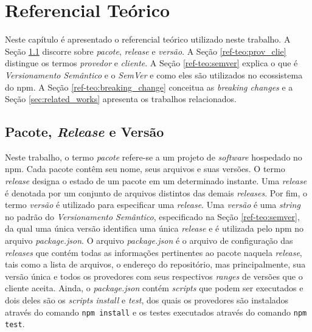 \chapter{Referencial Teórico}
\label{cap:ref-teorico}
Neste capítulo é apresentado o referencial teórico utilizado neste trabalho. A Seção \ref{ref-teo:pac_rel_ver} discorre sobre \textit{pacote}, \textit{release} e \textit{versão}. A Seção \ref{ref-teo:prov_clie} distingue os termos \textit{provedor} e \textit{cliente}. A Seção \ref{ref-teo:semver} explica o que é \textit{Versionamento Semântico} e o \textit{SemVer} e como eles são utilizados no ecossistema do \textsf{npm}. A Seção \ref{ref-teo:breaking_change} conceitua as \textit{breaking changes} e a Seção \ref{sec:related_works} apresenta os trabalhos relacionados.

\section{Pacote, \textit{Release} e Versão}
\label{ref-teo:pac_rel_ver}
Neste trabalho, o termo \textit{pacote} refere-se a um projeto de \textit{software} hospedado no \textsf{npm}. Cada pacote contêm seu nome, seus arquivos e suas versões. O termo \textit{release} designa o estado de um pacote em um determinado instante. Uma \textit{release} é denotada por um conjunto de arquivos distintos das demais \textit{releases}. Por fim, o termo \textit{versão} é utilizado para especificar uma \textit{release}. Uma \textit{versão} é uma \textit{string} no padrão do \textit{Versionamento Semântico}, especificado na Seção \ref{ref-teo:semver}, da qual uma única versão identifica uma única \textit{release} e é utilizada pelo \textsf{npm} no arquivo \textit{package.json}. O arquivo \textit{package.json} é o arquivo de configuração das \textit{releases} que contém todas as informações pertinentes ao pacote naquela \textit{release}, tais como a lista de arquivos, o endereço do repositório, mas principalmente, sua versão única e todos os provedores com seus respectivos \textit{ranges} de versões que o cliente aceita. Ainda, o \textit{package.json} contém \textit{scripts} que podem ser executados e dois deles são os \textit{scripts install} e \textit{test}, dos quais os provedores são instalados através do comando \texttt{npm install} e os testes executados através do comando \texttt{npm test}.

